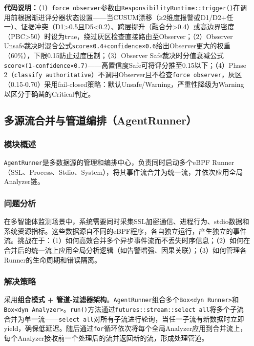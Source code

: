 \documentclass[a4paper]{ctexart}
\makeatletter
\renewcommand{\_}{%
  \ifmmode
    \nfss@text{\textunderscore}%
  \else
    \textunderscore\discretionary{}{}{}%
  \fi}
\makeatother
\begin{document}
\textbf{代码说明：}（1）\texttt{force\_observer}参数由\texttt{ResponsibilityRuntime::trigger()}在调用前根据渐进评分器状态设置——当CUSUM漂移（≥2维度报警或D1/D2+任一）、证据冲突（D1>0.5且D5<0.2）、跨层提升（融合分>0.4）或高边界密度（PBC>50）时设为true，绕过灰区检查直接路由至Observer；（2）Observer Unsafe裁决时混合公式\texttt{score×0.4+confidence×0.6}给出Observer更大的权重（60\%），下限0.15防止过度压制；（3）Observer Safe裁决时分值衰减公式\texttt{score×(1-confidence×0.7)}——高置信度Safe可将评分推至0.15以下；（4）Phase 2（\texttt{classify\_authoritative}）不调用Observer且不检查\texttt{force\_observer}，灰区（0.15-0.70）采用fail-closed策略：默认Unsafe/Warning，严重性降级为Warning以区分于确凿的Critical判定。


\subsection{多源流合并与管道编排（AgentRunner）}



\subsubsection{模块概述}



\texttt{AgentRunner}是多数据源的管理和编排中心，负责同时启动多个eBPF Runner（SSL、Process、Stdio、System），将其事件流合并为统一流，并依次应用全局Analyzer链。


\subsubsection{问题分析}



在多智能体监测场景中，系统需要同时采集SSL加密通信、进程行为、stdio数据和系统资源指标。这些数据源自不同的eBPF程序，各自独立运行，产生独立的事件流。挑战在于：（1）如何高效合并多个异步事件流而不丢失时序信息；（2）如何在合并后的统一流上应用全局分析逻辑（如告警增强、因果关联）；（3）如何管理各Runner的生命周期和错误隔离。


\subsubsection{解决策略}



采用\textbf{组合模式 + 管道-过滤器架构}。\texttt{AgentRunner}组合多个\texttt{Box<dyn Runner>}和\texttt{Box<dyn Analyzer>}。\texttt{run()}方法通过\texttt{futures::stream::select\_all}将多个子流合并为单一流——\texttt{select\_all}对所有子流进行轮询，当任一子流有新数据时立即yield，确保低延迟。随后通过\texttt{for}循环依次将每个全局Analyzer应用到合并流上，每个Analyzer接收前一个处理后的流并返回新的流，形成处理管道。
\end{document}
